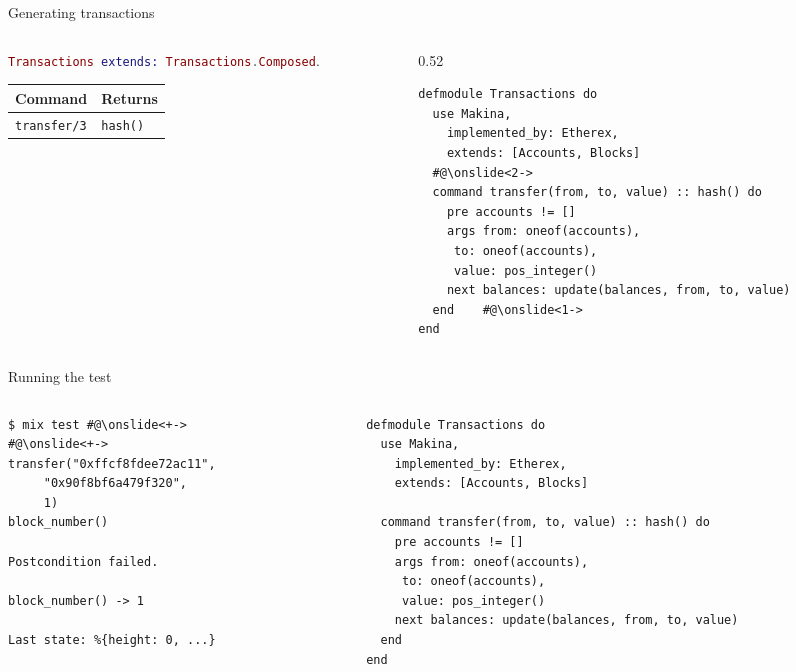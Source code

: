 \documentclass[aspectratio=169, 10pt]{beamer}
\begin{document}
\begin{frame}[label={sec:orgc4c71e4},fragile]{Generating transactions}
 \begin{columns}
\begin{column}{0.44\columnwidth}
\onslide<+->
\lstinline[language=elixir, style=display]~Transactions extends: Transactions.Composed~.
\vspace{10pt}

\onslide<+->
\begin{center}
\begin{tabular}{ll}
Command & Returns\\
\hline
\texttt{transfer/3} & \texttt{hash()}\\
\end{tabular}
\end{center}
\end{column}
\begin{column}{0.52\columnwidth}
\lstset{language=elixir,label= ,caption= ,captionpos=b,numbers=none,style=display}
\begin{lstlisting}
defmodule Transactions do
  use Makina,
    implemented_by: Etherex,
    extends: [Accounts, Blocks]
  #@\onslide<2->
  command transfer(from, to, value) :: hash() do
    pre accounts != []
    args from: oneof(accounts),
	 to: oneof(accounts),
	 value: pos_integer()
    next balances: update(balances, from, to, value)
  end    #@\onslide<1->
end
\end{lstlisting}
\end{column}
\end{columns}
\end{frame}

\begin{frame}[label={sec:orgab365cd},fragile]{Running the test}
 \begin{columns}
\begin{column}{0.44\columnwidth}
\lstset{language=bash,label= ,caption= ,captionpos=b,numbers=none,style=shell}
\begin{lstlisting}
$ mix test #@\onslide<+->
#@\onslide<+->
transfer("0xffcf8fdee72ac11",
	 "0x90f8bf6a479f320",
	 1)
block_number()

Postcondition failed.

block_number() -> 1

Last state: %{height: 0, ...}
\end{lstlisting}
\end{column}

\begin{column}{0.52\columnwidth}
\lstset{language=elixir,label= ,caption= ,captionpos=b,numbers=none,style=display}
\begin{lstlisting}
defmodule Transactions do
  use Makina,
    implemented_by: Etherex,
    extends: [Accounts, Blocks]

  command transfer(from, to, value) :: hash() do
    pre accounts != []
    args from: oneof(accounts),
	 to: oneof(accounts),
	 value: pos_integer()
    next balances: update(balances, from, to, value)
  end
end
\end{lstlisting}
\end{column}
\end{columns}
\end{frame}
\end{document}
